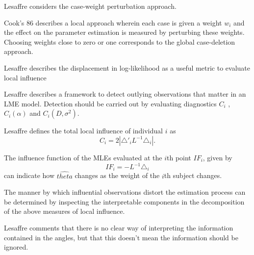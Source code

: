 \documentclass[12pt, a4paper]{report}
\theoremstyle{plain}
\theoremstyle{definition}
\theoremstyle{remark}
\begin{document}
Lesaffre considers the case-weight perturbation approach.


Cook's 86 describes a local approach wherein each case is given a weight $w_{i}$ and the effect on the parameter estimation is measured by perturbing these weights. Choosing weights close to zero or one corresponds to the global case-deletion approach.

Lesaffre  describes the displacement in log-likelihood as a useful metric to evaluate local influence %


Lesaffre describes a framework to detect outlying observations that matter in an LME model. Detection should be carried out by evaluating diagnostics $C_{i}$ , $C_{i}(\alpha)$ and $C_{i}(D,\sigma^2)$.


Lesaffre defines the total local influence of individual $i$ as
\begin{equation}
C_{i} = 2 | \triangle \prime _{i} L^{-1} \triangle_{i}|.
\end{equation}


The influence function of the MLEs evaluated at the $i$th point $IF_{i}$, given by
\begin{equation}
IF_{i} = -L^{-1}\triangle _{i}
\end{equation}
can indicate how $\hat{theta}$ changes as the weight of the $i$th
subject changes.

The manner by which influential observations distort the estimation process can be determined by inspecting the
interpretable components in the decomposition of the above measures of local influence.


Lesaffre comments that there is no clear way of interpreting the information contained in the angles, but that this doesn't mean the information should be ignored.


\printindex


\end{document}
